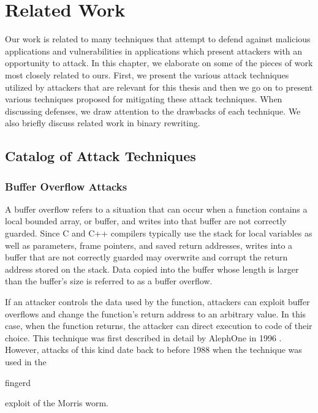 
\renewcommand{\thechapter}{2}

\chapter{Related Work}

Our work is related to many techniques that attempt to defend against malicious applications and
vulnerabilities in applications which present attackers with an opportunity to attack. In this
chapter, we elaborate on some of the pieces of work most closely related to ours. First, we present
the various attack techniques utilized by attackers that are relevant for this thesis and then we go
on to present various techniques proposed for mitigating these attack techniques. When discussing
defenses, we draw attention to the drawbacks of each technique. We also briefly discuss related work
in binary rewriting.

\section{Catalog of Attack Techniques}

\subsection{Buffer Overflow Attacks}

A buffer overflow refers to a situation that can occur when a function contains a local bounded
array, or buffer, and writes into that buffer are not correctly guarded. Since C and C++ compilers
typically use the stack for local variables as well as parameters, frame pointers, and saved return
addresses, writes into a buffer that are not correctly guarded may overwrite and corrupt the return
address stored on the stack. Data copied into the buffer whose length is larger than the buffer's
size is referred to as a buffer overflow.

If an attacker controls the data used by the function, attackers can exploit buffer overflows and
change the function's return address to an arbitrary value. In this case, when the function returns,
the attacker can direct execution to code of their choice. This technique was first described in
detail by AlephOne in 1996 \cite{one1996}. However, attacks of this kind date back to before 1988 when the
technique was used in the \begin{em}fingerd\end{em} exploit of the Morris worm.

